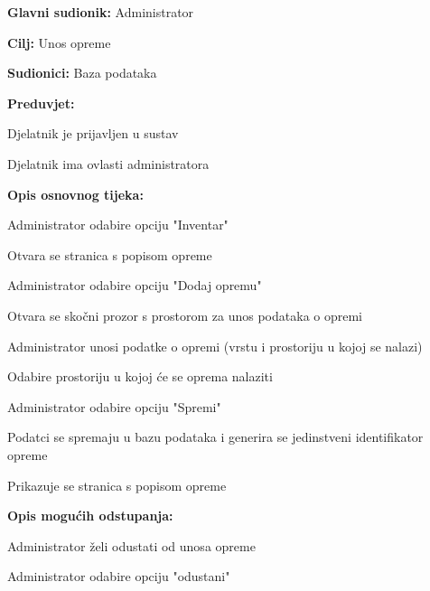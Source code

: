 					
					\noindent {}
					\begin{packed_item}
						
						\item \textbf{Glavni sudionik: }Administrator
						\item  \textbf{Cilj: }Unos opreme
							\item  \textbf{Sudionici: }Baza podataka
							\item  \textbf{Preduvjet: }
							\item[] \begin{packed_enum}
								
								\item[-] Djelatnik je prijavljen u sustav
								\item[-] Djelatnik ima ovlasti administratora
							\end{packed_enum}
							\item  \textbf{Opis osnovnog tijeka: }
							
							\item[] \begin{packed_enum}
								\item Administrator odabire opciju "Inventar"
								\item Otvara se stranica s popisom opreme
								\item Administrator odabire opciju "Dodaj opremu"
								\item Otvara se skočni prozor s prostorom za unos podataka o opremi
								\item Administrator unosi podatke o opremi (vrstu i prostoriju u kojoj se nalazi)
								\item Odabire prostoriju u kojoj će se oprema nalaziti
								\item Administrator odabire opciju "Spremi"
								\item Podatci se spremaju u bazu podataka i generira se jedinstveni identifikator opreme
								\item Prikazuje se stranica s popisom opreme
							\end{packed_enum}
							
							\item  \textbf{Opis mogućih odstupanja:}
							
							\item[] \begin{packed_item}
								
								\item[6.a] Administrator želi odustati od unosa opreme 
								\item[] \begin{packed_enum}
									\item 	Administrator odabire opciju "odustani"			
								\end{packed_enum}
							\end{packed_item}
						\end{packed_item}
				
